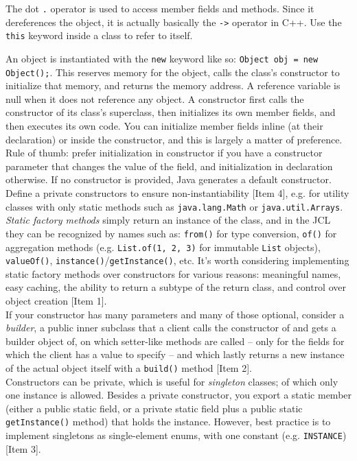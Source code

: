 \documentclass[table, xcdraw]{article}%
\begin{document}
The dot \texttt{.} operator is used to access member fields and methods. Since it dereferences the object, it is actually basically the \texttt{->} operator in C++. Use the \texttt{this} keyword inside a class to refer to itself.

An object is instantiated with the \texttt{new} keyword like so: \texttt{Object obj = new Object();}. This reserves memory for the object, calls the class's constructor to initialize that memory, and returns the memory address. A reference variable is null when it does not reference any object. A constructor first calls the constructor of its class's superclass, then initializes its own member fields, and then executes its own code. You can initialize member fields inline (at their declaration) or inside the constructor, and this is largely a matter of preference. Rule of thumb: prefer initialization in constructor if you have a constructor parameter that changes the value of the field, and initialization in declaration otherwise. If no constructor is provided, Java generates a default constructor. Define a private constructors to ensure non-instantiability [Item 4], e.g. for utility classes with only static methods such as \texttt{java.lang.Math} or \texttt{java.util.Arrays}.\\
\emph{Static factory methods} simply return an instance of the class, and in the JCL they can be recognized by names such as: \texttt{from()} for type conversion, \texttt{of()} for aggregation methods (e.g. \texttt{List.of(1, 2, 3)} for immutable \texttt{List} objects), \texttt{valueOf()}, \texttt{instance()}/\texttt{getInstance()}, etc. It's worth considering implementing static factory methods over constructors for various reasons: meaningful names, easy caching, the ability to return a subtype of the return class, and control over object creation [Item 1].\\
If your constructor has many parameters and many of those optional, consider a \emph{builder}, a public inner subclass that a client calls the constructor of and gets a builder object of, on which setter-like methods are called -- only for the fields for which the client has a value to specify -- and which lastly returns a new instance of the actual object itself with a \texttt{build()} method [Item 2].\\
Constructors can be private, which is useful for \emph{singleton} classes; of which only one instance is allowed. Besides a private constructor, you export a static member (either a public static field, or a private static field plus a public static \texttt{getInstance()} method) that holds the instance. However, best practice is to implement singletons as single-element enums, with one constant (e.g. \texttt{INSTANCE}) [Item 3]. 
\end{document}
